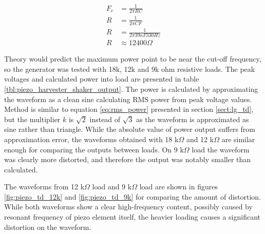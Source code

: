 \begin{equation}
\begin{split}
  F_c &= \frac{1}{2 \pi R C} \\
  R   &= \frac{1}{2 \pi C F} \\
  R   &= \frac{1}{2 \pi 39 nF 330 Hz} \\
  R   &\approx 12 400 \Omega 
\end{split}
\end{equation}

Theory would predict the maximum power point to be near the cut-off frequency, so the generator was tested with 18k, 12k and 9k ohm resistive loads. The peak voltages and calculated power into load are presented in table \ref{tbl:piezo_harvester_shaker_output}. The power is calculated by approximating the waveform as a clean sine calculating RMS power from peak voltage values. Method is similar to equation \eqref{eq:rms_power} presented in section \ref{sect:lg_td}, but the multiplier $k$ is $\sqrt{2}$ instead of $\sqrt{3}$ as the waveform is approximated as sine rather than triangle. While the absolute value of power output suffers from approximation error, the waveforms obtained with 18 k$\Omega$ and 12 k$\Omega$ are similar enough for comparing the outputs between loads. On 9 k$\Omega$ load the waveform was clearly more distorted, and therefore the output was notably smaller than calculated.

\begin{table}[htb]
\caption{\label{tbl:piezo_harvester_shaker_output} Output power of piezo harvester at various 18k, 12k and 9k $\Omega$ loads.}
\begin{center}
\end{center}
\end{table}

The waveforms from 12 k$\Omega$ load and 9 k$\Omega$ load are shown in figures \ref{fig:piezo_td_12k} and \ref{fig:piezo_td_9k} for comparing the amount of distortion. While both waveforms show a clear high-frequency content, possibly caused by resonant frequency of piezo element itself, the heavier loading causes a significant distortion on the waveform.


